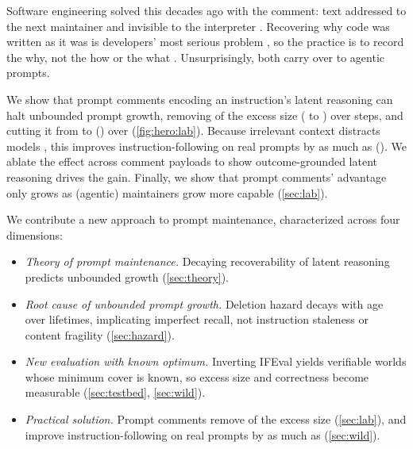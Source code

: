 Software engineering solved this decades ago with the comment: text addressed to the next maintainer and
invisible to the interpreter \citep{knuth1984literate}. Recovering why code was written as it was is
developers' most serious problem \citep{latoza2006mentalmodels}, so the practice is to record the why, not
the how or the what \citep{mcconnell2004codecomplete}. Unsurprisingly, both carry over to agentic prompts.

We show that prompt comments encoding an instruction's latent reasoning can halt unbounded prompt growth,
removing \HorizonExcessRemovedPct{} of the excess size (\HorizonControlExcessPct{} to
\HorizonPracticalExcessPct{}) over \HorizonT{} steps, and cutting it from \LabControlExcessPct{} to
\LabPracticalExcessPct{} (\LabPracticalDeltaExcessPp{}) over \LabT{} (\autoref{fig:hero:lab}).
Because irrelevant context distracts models \citep{shi2023distracted}, this improves instruction-following on
real prompts by as much as \WildDeltaSatPct{} (\WildDeltaSatPp{}).
We ablate the effect across comment payloads to show outcome-grounded latent reasoning drives the gain.
Finally, we show that prompt comments' advantage only grows as (agentic) maintainers grow more capable
(\autoref{sec:lab}).

We contribute a new approach to prompt maintenance, characterized across four dimensions:
\begin{itemize}[nosep,itemsep=2pt,parsep=2pt,topsep=2pt,leftmargin=*]
  \item \emph{Theory of prompt maintenance.} Decaying recoverability of latent reasoning predicts unbounded
    growth (\autoref{sec:theory}).
  \item \emph{Root cause of unbounded prompt growth.} Deletion hazard decays with age over \FieldSpells{}
    lifetimes, implicating imperfect recall, not instruction staleness or content fragility
    (\autoref{sec:hazard}).
  \item \emph{New evaluation with known optimum.} Inverting IFEval yields verifiable worlds whose minimum cover is
    known, so excess size and correctness become measurable (\autoref{sec:testbed}, \autoref{sec:wild}).
  \item \emph{Practical solution.} Prompt comments remove \HorizonExcessRemovedPct{} of the excess size
    (\autoref{sec:lab}), and improve instruction-following on real prompts by as much as \WildDeltaSatPct{}
    (\autoref{sec:wild}).
\end{itemize}
